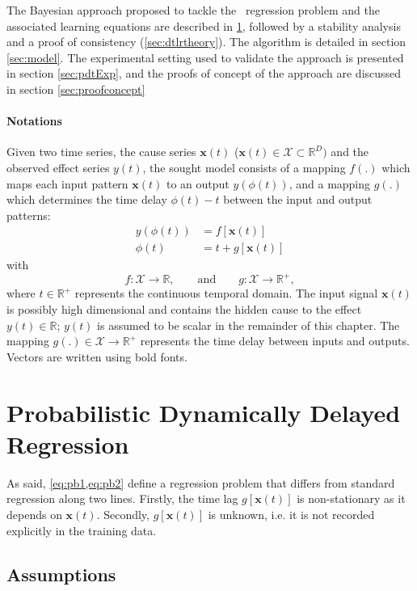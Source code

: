 The Bayesian approach proposed to tackle the \XX\ regression problem and the associated learning 
equations are described in \cref{sec:dtlrformulation}, followed by a stability analysis and 
a proof of consistency (\cref{sec:dtlrtheory}). The algorithm is detailed in section 
\ref{sec:model}. The experimental setting used to validate the approach is presented in section 
\ref{sec:pdtExp}, and the proofs of concept of the approach are discussed in section 
\ref{sec:proofconcept}

\paragraph{Notations}
Given two time series, the cause series 
$\mathbf{x}(t)$ ($\mathbf{x}(t)\in \mathcal{X} \subset \mathbb{R}^D)$ and the observed effect 
series $y(t)$, the sought model consists of a mapping $f(.)$ which maps each 
input pattern $\mathbf{x}(t)$ to an output $y(\phi(t))$, and a mapping $g(.)$ which 
determines the time delay $\phi(t)-t$ between the input and output patterns:
%
\begin{align}
  y(\phi(t)) & = f[\mathbf{x}(t)]\label{eq:pb1}\\
  \phi(t) & = t + g[\mathbf{x}(t)]\label{eq:pb2} 
\end{align}
with
\[
f: \mathcal{X}  \rightarrow \mathbb{R},\qquad\text{and}\qquad
g: \mathcal{X}  \rightarrow \mathbb{R}^{+},
\]
where $t \in \mathbb{R}^{+}$ represents the continuous temporal domain. The 
input signal $\mathbf{x}(t)$ is possibly high dimensional and contains the hidden cause 
to the effect $y(t)\in\mathbb{R}$; $y(t)$ is assumed to be scalar in the 
remainder of this chapter. The mapping 
$g(.) \in \mathcal{X} \rightarrow  \mathbb{R}^+$ represents the time delay 
between inputs and outputs. Vectors are written using bold fonts.
  

\section{Probabilistic Dynamically Delayed Regression}\label{sec:dtlrformulation}
As said, \cref{eq:pb1,eq:pb2} define a regression problem that differs from standard regression 
along two lines. Firstly, the time lag $g[\mathbf{x}(t)]$ is non-stationary as it 
depends on $\mathbf{x}(t)$. Secondly, $g[\mathbf{x}(t)]$ is unknown, i.e. it is not recorded 
explicitly in the training data. 

\subsection{Assumptions}

